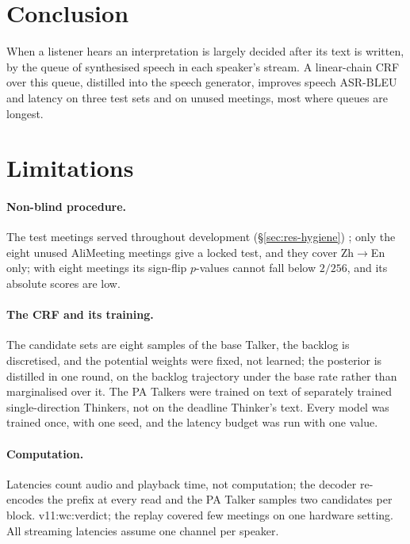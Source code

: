 \section{Conclusion}
\label{sec:conclusion}

When a listener hears an interpretation is largely decided after its text is written, by the queue of synthesised
speech in each speaker's stream. A linear-chain CRF over this queue, distilled into the speech generator, improves
speech ASR-BLEU and latency on three test sets and on unused meetings, most where queues are longest.

\section*{Limitations}

\paragraph{Non-blind procedure.} The test meetings served throughout development (\S\ref{sec:res-hygiene})%
\ifAliEval{}; only the eight unused AliMeeting meetings give a locked test, and they cover Zh$\rightarrow$En only;
with eight meetings its sign-flip $p$-values cannot fall below $2/256$, and its absolute scores are low\fi.

\paragraph{The CRF and its training.} The candidate sets are eight samples of the base Talker, the backlog is
discretised, and the potential weights were fixed, not learned; the posterior is distilled in one round, on the backlog
trajectory under the base rate rather than marginalised over it. The PA Talkers were trained on text of separately
trained single-direction Thinkers, not on the deadline Thinker's text. Every model was trained once, with one
seed, and the latency budget was run with one value.

\paragraph{Computation.} Latencies count audio and playback time, not computation; the decoder re-encodes the prefix
at every read and the PA Talker samples two candidates per block.\ifWallclock{} \num{v11:wc:verdict}; the replay
covered few meetings on one hardware setting.\fi{} All streaming latencies assume one channel per speaker.

